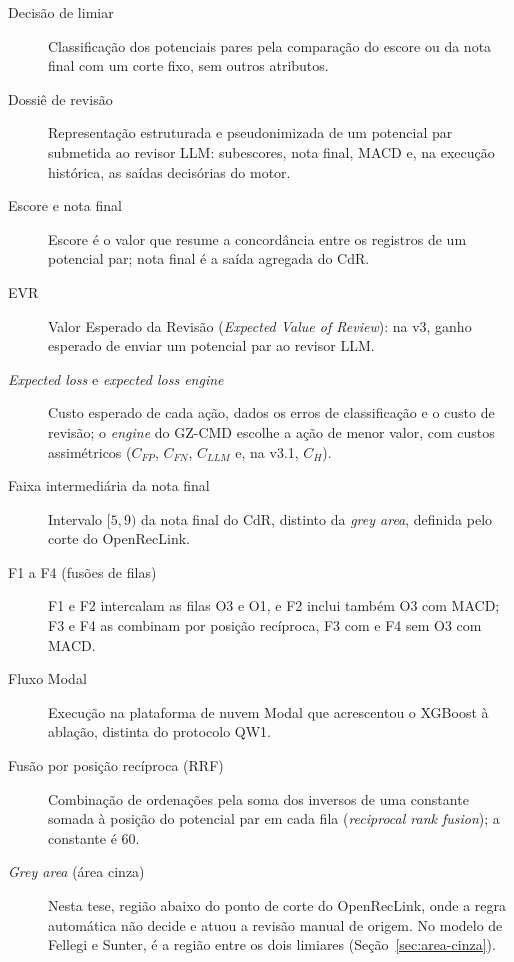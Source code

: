 \begin{description}
\item[Decisão de limiar] Classificação dos potenciais pares pela comparação do escore ou da nota final com um corte fixo, sem outros atributos.

\item[Dossiê de revisão] Representação estruturada e pseudonimizada de um potencial par submetida ao revisor LLM: subescores, nota final, MACD e, na execução histórica, as saídas decisórias do motor.

\item[Escore e nota final] Escore é o valor que resume a concordância entre os registros de um potencial par; nota final é a saída agregada do CdR.

\item[EVR] Valor Esperado da Revisão (\textit{Expected Value of Review}): na v3, ganho esperado de enviar um potencial par ao revisor LLM.

\item[\textit{Expected loss} e \textit{expected loss engine}] Custo esperado de cada ação, dados os erros de classificação e o custo de revisão; o \textit{engine} do GZ-CMD escolhe a ação de menor valor, com custos assimétricos ($C_{FP}$, $C_{FN}$, $C_{LLM}$ e, na v3.1, $C_H$).

\item[Faixa intermediária da nota final] Intervalo $[5,9)$ da nota final do CdR, distinto da \textit{grey area}, definida pelo corte do OpenRecLink.

\item[F1 a F4 (fusões de filas)] F1 e F2 intercalam as filas O3 e O1, e F2 inclui também O3 com MACD; F3 e F4 as combinam por posição recíproca, F3 com e F4 sem O3 com MACD.

\item[Fluxo Modal] Execução na plataforma de nuvem Modal que acrescentou o XGBoost à ablação, distinta do protocolo QW1.

\item[Fusão por posição recíproca (RRF)] Combinação de ordenações pela soma dos inversos de uma constante somada à posição do potencial par em cada fila (\textit{reciprocal rank fusion}); a constante é 60.

\item[\textit{Grey area} (área cinza)] Nesta tese, região abaixo do ponto de corte do OpenRecLink, onde a regra automática não decide e atuou a revisão manual de origem. No modelo de Fellegi e Sunter, é a região entre os dois limiares (Seção~\ref{sec:area-cinza}).


\end{description}
